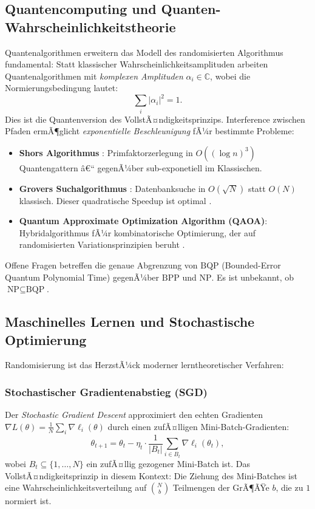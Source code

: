 ﻿\documentclass[12pt,a4paper]{article}
\theoremstyle{definition}
\theoremstyle{plain}
\theoremstyle{remark}
\begin{document}
\subsection{Quantencomputing und Quanten-Wahr\-schein\-lich\-keits\-theo\-rie}

Quantenalgorithmen erweitern das Modell des randomisierten Algorithmus
fundamental: Statt klassischer Wahrscheinlichkeitsamplituden arbeiten
Quantenalgorithmen mit \emph{komplexen Amplituden} $\alpha_i \in \mathbb{C}$,
wobei die Normierungsbedingung lautet:
\[
  \sum_i |\alpha_i|^2 = 1.
\]
Dies ist die Quantenversion des VollstÃ¤ndigkeitsprinzips. Interference zwischen
Pfaden ermÃ¶glicht \emph{exponentielle Beschleunigung} fÃ¼r bestimmte Probleme:
\begin{itemize}
  \item \textbf{Shors Algorithmus} \cite{shor1994algorithms}: Primfaktorzerlegung
    in $O((\log n)^3)$ Quantengattern â€“ gegenÃ¼ber sub-exponetiell im Klassischen.
  \item \textbf{Grovers Suchalgorithmus} \cite{grover1996fast}: Datenbanksuche
    in $O(\sqrt{N})$ statt $O(N)$ klassisch. Dieser quadratische Speedup ist
    optimal \cite{bennett1997strengths}.
  \item \textbf{Quantum Approximate Optimization Algorithm (QAOA)}:
    Hybridalgorithmus fÃ¼r kombinatorische Optimierung, der auf randomisierten
    Variationsprinzipien beruht \cite{farhi2014quantum}.
\end{itemize}
Offene Fragen betreffen die genaue Abgrenzung von $\text{BQP}$
(Bounded-Error Quantum Polynomial Time) gegenÃ¼ber $\text{BPP}$ und $\text{NP}$.
Es ist unbekannt, ob $\text{NP} \subseteq \text{BQP}$.

\subsection{Maschinelles Lernen und Stochastische Optimierung}

Randomisierung ist das HerzstÃ¼ck moderner lerntheoretischer Verfahren:

\subsubsection{Stochastischer Gradientenabstieg (SGD)}
Der \emph{Stochastic Gradient Descent} \cite{robbins1951stochastic} approximiert
den echten Gradienten $\nabla L(\theta) = \frac{1}{N}\sum_i \nabla \ell_i(\theta)$
durch einen zufÃ¤lligen Mini-Batch-Gradienten:
\[
  \theta_{t+1} = \theta_t - \eta_t \cdot \frac{1}{|B_t|} \sum_{i \in B_t}
  \nabla \ell_i(\theta_t),
\]
wobei $B_t \subseteq \{1,\ldots,N\}$ ein zufÃ¤llig gezogener Mini-Batch ist.
Das VollstÃ¤ndigkeitsprinzip in diesem Kontext: Die Ziehung des Mini-Batches
ist eine Wahrscheinlichkeitsverteilung auf $\binom{N}{b}$ Teilmengen der
GrÃ¶ÃŸe $b$, die zu $1$ normiert ist.
\end{document}
